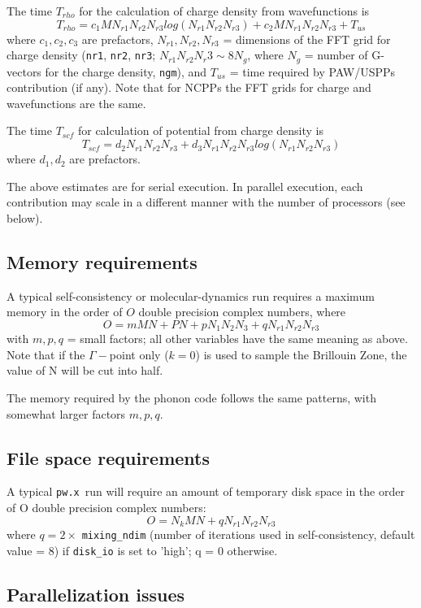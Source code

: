 \documentclass[12pt,a4paper]{article}
\def\pw.x{\texttt{pw.x}}
\begin{document}
The time $T_{rho}$ for the calculation of charge density from wavefunctions is
$$T_{rho} = c_1 M N_{r1} N_{r2}N_{r3} log(N_{r1} N_{r2} N_{r3}) + 
            c_2 M N_{r1} N_{r2} N_{r3} + T_{us}$$
where $c_1, c_2, c_3$ are prefactors, $N_{r1}, N_{r2}, N_{r3}$ =
dimensions of the FFT grid for charge density (\texttt{nr1},
\texttt{nr2}, \texttt{nr3}; $N_{r1} N_{r2} N_r3 \sim 8N_g$,
where $N_g$ = number of G-vectors for the charge density,
\texttt{ngm}), and 
$T_{us}$ = time required by PAW/USPPs contribution (if any).
Note that for NCPPs the FFT grids for charge and
wavefunctions are the same.
 
The time $T_{scf}$ for calculation of potential from charge density is
$$T_{scf} = d_2 N_{r1} N_{r2} N_{r3} + d_3 N_{r1} N_{r2} N_{r3} 
            log(N_{r1} N_{r2} N_{r3} )$$
where $d_1, d_2$ are prefactors.

The above estimates are for serial execution. In parallel execution,
each contribution may scale in a different manner with the number of processors (see below).

\subsection{Memory requirements}

A typical self-consistency or molecular-dynamics run requires a maximum
memory in the order of $O$ double precision complex numbers, where
$$ O = m M N + P N + p N_1 N_2 N_3 + q N_{r1} N_{r2} N_{r3}$$
with $m, p, q$ = small factors; all other variables have the same meaning as
above. Note that if the $\Gamma-$point only ($k=0$) is used to sample the 
Brillouin Zone, the value of N will be cut into half.

The memory required by the phonon code follows the same patterns, with
somewhat larger factors $m, p, q$.

\subsection{File space requirements}

A typical \pw.x\ run will require an amount of temporary disk space in the
order of O double precision complex numbers:
$$O = N_k M N + q N_{r1} N_{r2}N_{r3}$$
where $q = 2\times$ \texttt{mixing\_ndim} (number of iterations used in 
self-consistency, default value = 8) if \texttt{disk\_io} is set to 'high'; q = 0 
otherwise.

\subsection{Parallelization issues}
\label{SubSec:badpara}
\end{document}
